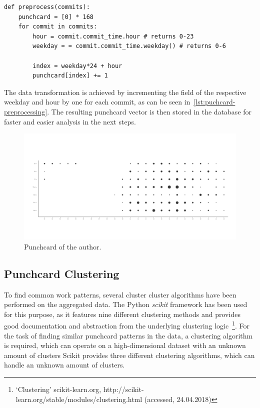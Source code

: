 \begin{verbatim}
def preprocess(commits):
    punchcard = [0] * 168
    for commit in commits:
        hour = commit.commit_time.hour # returns 0-23
        weekday = = commit.commit_time.weekday() # returns 0-6

        index = weekday*24 + hour
        punchcard[index] += 1

\end{verbatim}
\begingroup
{}\label{lst:puchcard-preprocessing}
\endgroup

The data transformation is achieved by incrementing the field of the respective weekday and hour by one for each commit, as can be seen in~\ref{lst:puchcard-preprocessing}.
The resulting punchcard vector is then stored in the database for faster and easier analysis in the next steps.

\begin{figure}[H]
    \includegraphics[scale=0.32]{./graphs/analysis/ordered-punchcard}
    \centering
    \caption{Punchcard of the author.}\label{fig:working-hour-rhythm-author}
\end{figure}


\subsection{Punchcard Clustering}

To find common work patterns, several cluster cluster algorithms have been performed on the aggregated data.
The Python \emph{scikit} framework has been used for this purpose, as it features nine different clustering methods and provides good documentation and abstraction from the underlying clustering logic~\footnote{`Clustering' scikit-learn.org, http://scikit-learn.org/stable/modules/clustering.html (accessed, 24.04.2018)}.
For the task of finding similar punchcard patterns in the data, a clustering algorithm is required, which can operate on a high-dimensional dataset with an unknown amount of clusters
Scikit provides three different clustering algorithms, which can handle an unknown amount of clusters.

